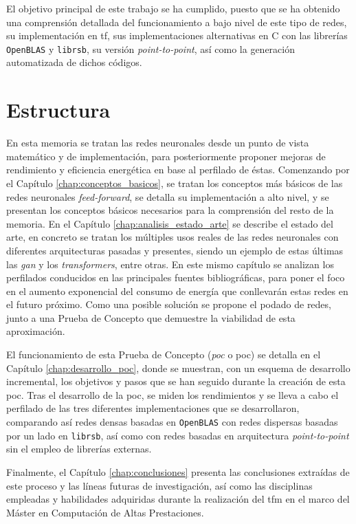 El objetivo principal de este trabajo se ha cumplido, puesto que se ha obtenido una comprensión detallada del funcionamiento a bajo nivel de este tipo de redes, su implementación en \acrlong{tf}, sus implementaciones alternativas en C con las librerías \texttt{OpenBLAS} y \texttt{librsb}, su versión \textit{point-to-point}, así como la generación automatizada de dichos códigos.

\section{Estructura}
\label{sec:estructura}
En esta memoria se tratan las redes neuronales desde un punto de vista matemático y de implementación, para posteriormente proponer mejoras de rendimiento y eficiencia energética en base al perfilado de éstas. Comenzando por el Capítulo \ref{chap:conceptos_basicos}, se tratan los conceptos más básicos de las redes neuronales \textit{feed-forward}, se detalla su implementación a alto nivel, y se presentan los conceptos básicos necesarios para la comprensión del resto de la memoria. En el Capítulo \ref{chap:analisis_estado_arte} se describe el estado del arte, en concreto se tratan los múltiples usos reales de las redes neuronales con diferentes arquitecturas pasadas y presentes, siendo un ejemplo de estas últimas las \textit{\acrlong{gan}} y los \textit{transformers}, entre otras. En este mismo capítulo se analizan los perfilados conducidos en las principales fuentes bibliográficas, para poner el foco en el aumento exponencial del consumo de energía que conllevarán estas redes en el futuro próximo. Como una posible solución se propone el podado de redes, junto a una Prueba de Concepto que demuestre la viabilidad de esta aproximación.

El funcionamiento de esta Prueba de Concepto (\textit{\acrlong{poc}} o \acrshort{poc}) se detalla en el Capítulo \ref{chap:desarrollo_poc}, donde se muestran, con un esquema de desarrollo incremental, los objetivos y pasos que se han seguido durante la creación de esta \acrshort{poc}. Tras el desarrollo de la \acrshort{poc}, se miden los rendimientos y se lleva a cabo el perfilado de las tres diferentes implementaciones que se desarrollaron, comparando así redes densas basadas en \texttt{OpenBLAS} con redes dispersas basadas por un lado en \texttt{librsb}, así como con redes basadas en arquitectura \textit{point-to-point} sin el empleo de librerías externas.

Finalmente, el Capítulo \ref{chap:conclusiones} presenta las conclusiones extraídas de este proceso y las líneas futuras de investigación, así como las disciplinas empleadas y habilidades adquiridas durante la realización del \acrshort{tfm} en el marco del Máster en Computación de Altas Prestaciones.